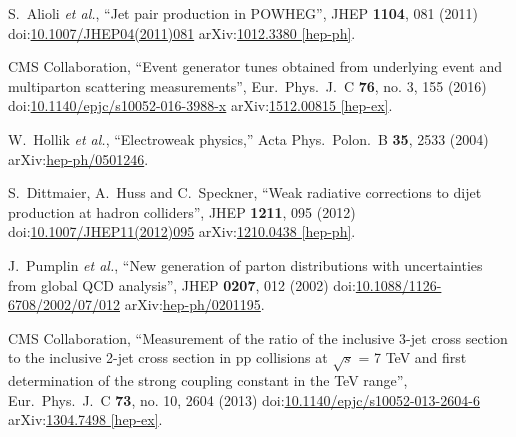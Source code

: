\begin{thebibliography}{99}
S.~Alioli {\it et al.}, ``Jet pair production in POWHEG'', JHEP {\bf 1104}, 081 (2011) doi:\href{http://dx.doi.org/10.1007/JHEP04(2011)081}{10.1007/JHEP04(2011)081} arXiv:\href{https://arxiv.org/abs/1012.3380}{1012.3380 [hep-ph]}.

CMS Collaboration, ``Event generator tunes obtained from underlying event and multiparton scattering measurements'', Eur.\ Phys.\ J.\ C {\bf 76}, no. 3, 155 (2016) doi:\href{http://dx.doi.org/10.1140/epjc/s10052-016-3988-x}{10.1140/epjc/s10052-016-3988-x} arXiv:\href{https://arxiv.org/abs/1512.00815}{1512.00815 [hep-ex]}.
  
W.~Hollik {\it et al.}, ``Electroweak physics,'' Acta Phys.\ Polon.\ B {\bf 35}, 2533 (2004) arXiv:\href{https://arxiv.org/abs/hep-ph/0501246}{hep-ph/0501246}.
    
S.~Dittmaier, A.~Huss and C.~Speckner, ``Weak radiative corrections to dijet production at hadron colliders'', JHEP {\bf 1211}, 095 (2012) doi:\href{http://dx.doi.org/10.1007/JHEP11(2012)095}{10.1007/JHEP11(2012)095} arXiv:\href{https://arxiv.org/abs/1210.0438}{1210.0438 [hep-ph]}.
  

J.~Pumplin {\it et al.}, ``New generation of parton distributions with uncertainties from global QCD analysis'', JHEP {\bf 0207}, 012 (2002) doi:\href{http://dx.doi.org/10.1088/1126-6708/2002/07/012}{10.1088/1126-6708/2002/07/012} arXiv:\href{https://arxiv.org/abs/hep-ph/0201195}{hep-ph/0201195}.
    
CMS Collaboration, ``Measurement of the ratio of the inclusive 3-jet cross section to the inclusive 2-jet cross section in pp collisions at $\sqrt{s}$ = 7 TeV and first determination of the strong coupling constant in the TeV range'', Eur.\ Phys.\ J.\ C {\bf 73}, no. 10, 2604 (2013) doi:\href{http://dx.doi.org/10.1140/epjc/s10052-013-2604-6}{10.1140/epjc/s10052-013-2604-6} arXiv:\href{https://arxiv.org/abs/1304.7498}{1304.7498 [hep-ex]}.



\end{thebibliography}
